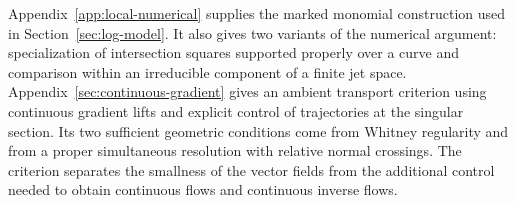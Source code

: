 Appendix~\ref{app:local-numerical} supplies the marked monomial
construction used in Section~\ref{sec:log-model}.  It also gives two
variants of the numerical argument: specialization of intersection
squares supported properly over a curve and comparison within an
irreducible component of a finite jet space.
Appendix~\ref{sec:continuous-gradient} gives an ambient transport
criterion using continuous gradient lifts and explicit control of
trajectories at the singular section.  Its two sufficient geometric
conditions come from Whitney regularity and from a proper simultaneous
resolution with relative normal crossings.  The criterion separates the
smallness of the vector fields from the additional control needed to
obtain continuous flows and continuous inverse flows.
